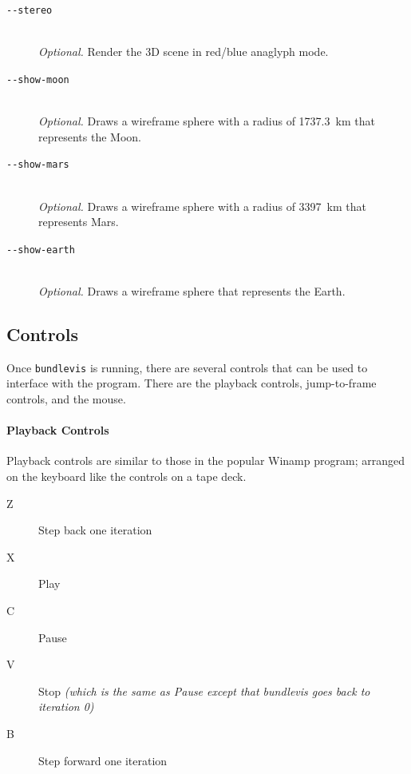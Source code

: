 \begin{description}
\item[\texttt{-\/-stereo}] \hfill \\
  \emph{Optional.} Render the 3D scene in red/blue anaglyph mode.

\item[\texttt{-\/-show-moon}] \hfill \\
  \emph{Optional.} Draws a wireframe sphere with a radius of 1737.3~km
  that represents the Moon.

\item[\texttt{-\/-show-mars}] \hfill \\
  \emph{Optional.} Draws a wireframe sphere with a radius of 3397~km
  that represents Mars.

\item[\texttt{-\/-show-earth}] \hfill \\
  \emph{Optional.} Draws a wireframe sphere that represents the Earth.

\end{description}

\subsection{Controls}

Once \texttt{bundlevis} is running, there are several controls that
can be used to interface with the program. There are the playback
controls, jump-to-frame controls, and the mouse.

\paragraph{Playback Controls}

Playback controls are similar to those in the popular Winamp program;
arranged on the keyboard like the controls on a tape deck.

\newenvironment{myindentpar}[1]
               {\begin{list}{}
                   {\setlength{\leftmargin}{#1}}
                 \item[]
               }
               {\end{list}}

\begin{myindentpar}{3cm}
\begin{description}
  \item[Z] Step back one iteration
  \item[X] Play
  \item[C] Pause
  \item[V] Stop \emph{(which is the same as Pause except that
    bundlevis goes back to iteration 0)}
  \item[B] Step forward one iteration
\end{description}
\end{myindentpar}

